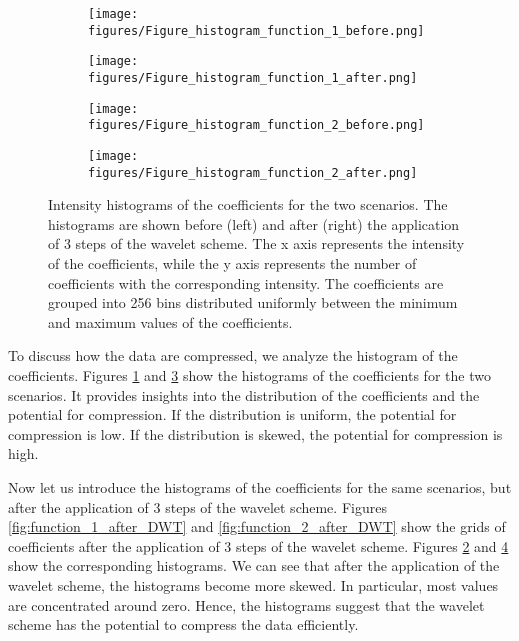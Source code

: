 \begin{figure}[htbp]
    \centering
    \begin{subfigure}[b]{0.49\textwidth}
        \texttt{[image: figures/Figure\_histogram\_function\_1\_before.png]}
        \caption{}
        \label{fig:histogram_function_1_before}
    \end{subfigure}
    \begin{subfigure}[b]{0.49\textwidth}
        \texttt{[image: figures/Figure\_histogram\_function\_1\_after.png]}
        \caption{}
        \label{fig:histogram_function_1_after}
    \end{subfigure}
    \begin{subfigure}[b]{0.49\textwidth}
        \texttt{[image: figures/Figure\_histogram\_function\_2\_before.png]}
        \caption{}
        \label{fig:histogram_function_2_before}
    \end{subfigure}
    \begin{subfigure}[b]{0.49\textwidth}
        \texttt{[image: figures/Figure\_histogram\_function\_2\_after.png]}
        \caption{}
        \label{fig:histogram_function_2_after}
    \end{subfigure}
    \caption{
        Intensity histograms of the coefficients for the two scenarios.
        The histograms are shown before (left) and after (right) the application of 3 steps of the wavelet scheme.
        The x axis represents the intensity of the coefficients, while the y axis represents the number of coefficients with the corresponding intensity.
        The coefficients are grouped into 256 bins distributed uniformly between the minimum and maximum values of the coefficients.
    }
    \label{fig:histograms}
\end{figure}

To discuss how the data are compressed, we analyze the histogram of the coefficients.
Figures \ref{fig:histogram_function_1_before} and \ref{fig:histogram_function_2_before} show the histograms of the coefficients for the two scenarios.
It provides insights into the distribution of the coefficients and the potential for compression.
If the distribution is uniform, the potential for compression is low.
If the distribution is skewed, the potential for compression is high.

Now let us introduce the histograms of the coefficients for the same scenarios, but after the application of 3 steps of the wavelet scheme.
Figures \ref{fig:function_1_after_DWT} and \ref{fig:function_2_after_DWT} show the grids of coefficients after the application of 3 steps of the wavelet scheme.
Figures \ref{fig:histogram_function_1_after} and \ref{fig:histogram_function_2_after} show the corresponding histograms.
We can see that after the application of the wavelet scheme, the histograms become more skewed.
In particular, most values are concentrated around zero.
Hence, the histograms suggest that the wavelet scheme has the potential to compress the data efficiently.

